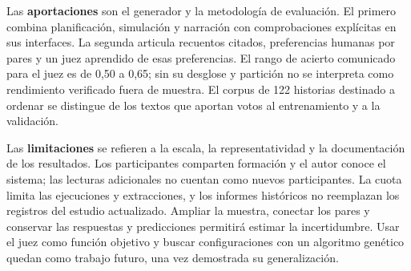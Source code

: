 \begin{conclusions}
Las \textbf{aportaciones} son el generador y la metodología de evaluación. El primero combina
planificación, simulación y narración con comprobaciones explícitas en sus interfaces. La segunda
articula recuentos citados, preferencias humanas por pares y un juez aprendido de esas preferencias.
El rango de acierto comunicado para el juez es de 0,50 a 0,65; sin su desglose y partición no se
interpreta como rendimiento verificado fuera de muestra. El corpus de 122 historias destinado a
ordenar se distingue de los textos que aportan votos al entrenamiento y a la validación.

Las \textbf{limitaciones} se refieren a la escala, la representatividad y la documentación de los
resultados. Los participantes comparten formación y el autor conoce el sistema; las lecturas
adicionales no cuentan como nuevos participantes. La cuota limita las ejecuciones y extracciones,
y los informes históricos no reemplazan los registros del estudio actualizado. Ampliar la muestra,
conectar los pares y conservar las respuestas y predicciones permitirá estimar la incertidumbre.
Usar el juez como función objetivo y buscar configuraciones con un algoritmo genético quedan como
trabajo futuro, una vez demostrada su generalización.

\end{conclusions}
